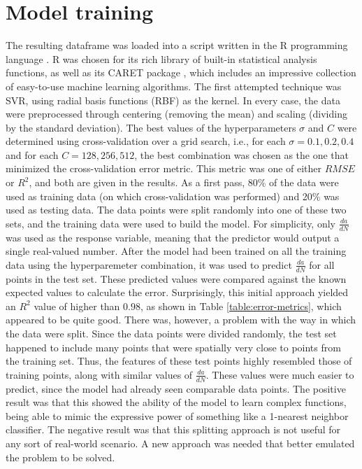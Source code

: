 \section{Model training}
The resulting dataframe was loaded into a script written in the R programming language \cite{statistical2009r}.  R was chosen for its rich library of built-in statistical analysis functions, as well as its CARET package \cite{caret2008}, which includes an impressive collection of easy-to-use machine learning algorithms.  The first attempted technique was SVR, using radial basis functions (RBF) as the kernel.  In every case, the data were preprocessed through centering (removing the mean) and scaling (dividing by the standard deviation).  The best values of the hyperparameters $\sigma$ and $C$ were determined using cross-validation over a grid search, i.e., for each $\sigma = 0.1, 0.2, 0.4$ and for each $C = 128, 256, 512$, the best combination was chosen as the one that minimized the cross-validation error metric.  This metric was one of either $RMSE$ or $R^2$, and both are given in the results.  As a first pass, 80\% of the data were used as training data (on which cross-validation was performed) and 20\% was used as testing data.  The data points were split randomly into one of these two sets, and the training data were used to build the model.  For simplicity, only $\frac{da}{dN}$ was used as the response variable, meaning that the predictor would output a single real-valued number.  After the model had been trained on all the training data using the hyperparemeter combination, it was used to predict $\frac{da}{dN}$ for all points in the test set.  These predicted values were compared against the known expected values to calculate the error.  Surprisingly, this initial approach yielded an $R^2$ value of higher than $0.98$, as shown in Table \ref{table:error-metrics}, which appeared to be quite good.  There was, however, a problem with the way in which the data were split.  Since the data points were divided randomly, the test set happened to include many points that were spatially very close to points from the training set.  Thus, the features of these test points highly resembled those of training points, along with similar values of $\frac{da}{dN}$.  These values were much easier to predict, since the model had already seen comparable data points.  The positive result was that this showed the ability of the model to learn complex functions, being able to mimic the expressive power of something like a 1-nearest neighbor classifier.  The negative result was that this splitting approach is not useful for any sort of real-world scenario.  A new approach was needed that better emulated the problem to be solved.

